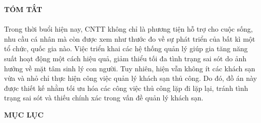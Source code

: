 \documentclass{article}
\makeatletter
\renewcommand{\tableofcontents}{%
	\@starttoc{toc}%
}
\makeatother
\begin{document}
	\begin{center}
		\fontsize{16}{20}\selectfont
		\textbf{TÓM TẮT\\} 
	\end{center}
	\fontsize{13}{13}\selectfont
	\paragraph{}
	Trong thời buổi hiện nay, CNTT không chỉ là phương tiện hỗ  trợ cho cuộc sống, nhu cầu cá nhân mà còn được xem như thước đo về sự phát triển của bất kì một tổ chức, quốc gia nào. Việc triển khai các hệ thống quản lý giúp gia tăng năng suất hoạt động một cách hiệu quả, giảm thiểu  tối đa tình trạng sai sót do ảnh hưởng về mặt tâm sinh lý con người. Tuy nhiên, hiện vẫn không ít các khách sạn vừa và nhỏ chỉ thực hiện công việc quản lý khách sạn thủ công. Do đó, đồ án này được thiết kế nhằm tối ưu hóa các công việc thủ công lặp đi lặp lại, tránh tình trạng sai sót và thiếu chính xác trong vấn đề quản lý khách sạn.
	
	\pagebreak
	
	\begin{center}
		\setcounter{page}{1}
		\fontsize{16}{20}\selectfont
		\textbf{MỤC LỤC\\} 
		
	\end{center}
	\fontsize{13}{13}\selectfont
	\tableofcontents
	
	
	
	
	
	\pagebreak
	\begin{center}
		\setcounter{page}{2}
	\end{center}
	
\end{document}
